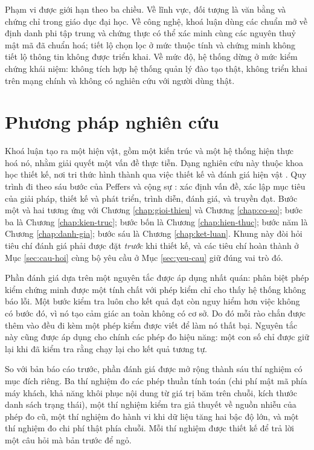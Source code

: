 Phạm vi được giới hạn theo ba chiều. Về lĩnh vực, đối tượng là văn bằng và chứng chỉ trong giáo dục đại học. Về công nghệ, khoá luận dùng các chuẩn mở về định danh phi tập trung và chứng thực có thể xác minh cùng các nguyên thuỷ mật mã đã chuẩn hoá; tiết lộ chọn lọc ở mức thuộc tính và chứng minh không tiết lộ thông tin không được triển khai. Về mức độ, hệ thống dừng ở mức kiểm chứng khái niệm: không tích hợp hệ thống quản lý đào tạo thật, không triển khai trên mạng chính và không có nghiên cứu với người dùng thật.

\section{Phương pháp nghiên cứu}
\label{sec:phuong-phap}

Khoá luận tạo ra một hiện vật, gồm một kiến trúc và một hệ thống hiện thực hoá nó, nhằm giải quyết một vấn đề thực tiễn. Dạng nghiên cứu này thuộc khoa học thiết kế, nơi tri thức hình thành qua việc thiết kế và đánh giá hiện vật \cite{Hevner2004}. Quy trình đi theo sáu bước của Peffers và cộng sự \cite{Peffers2007}: xác định vấn đề, xác lập mục tiêu của giải pháp, thiết kế và phát triển, trình diễn, đánh giá, và truyền đạt. Bước một và hai tương ứng với Chương \ref{chap:gioi-thieu} và Chương \ref{chap:co-so}; bước ba là Chương \ref{chap:kien-truc}; bước bốn là Chương \ref{chap:hien-thuc}; bước năm là Chương \ref{chap:danh-gia}; bước sáu là Chương \ref{chap:ket-luan}. Khung này đòi hỏi tiêu chí đánh giá phải được đặt \emph{trước} khi thiết kế, và các tiêu chí hoàn thành ở Mục \ref{sec:cau-hoi} cùng bộ yêu cầu ở Mục \ref{sec:yeu-cau} giữ đúng vai trò đó.

Phần đánh giá dựa trên một nguyên tắc được áp dụng nhất quán: phân biệt phép kiểm chứng minh được một tính chất với phép kiểm chỉ cho thấy hệ thống không báo lỗi. Một bước kiểm tra luôn cho kết quả đạt còn nguy hiểm hơn việc không có bước đó, vì nó tạo cảm giác an toàn không có cơ sở. Do đó mỗi rào chắn được thêm vào đều đi kèm một phép kiểm được viết để làm nó thất bại. Nguyên tắc này cũng được áp dụng cho chính các phép đo hiệu năng: một con số chỉ được giữ lại khi đã kiểm tra rằng chạy lại cho kết quả tương tự.

So với bản báo cáo trước, phần đánh giá được mở rộng thành sáu thí nghiệm có mục đích riêng. Ba thí nghiệm đo các phép thuần tính toán (chi phí mật mã phía máy khách, khả năng khôi phục nội dung từ giá trị băm trên chuỗi, kích thước danh sách trạng thái), một thí nghiệm kiểm tra giả thuyết về nguồn nhiễu của phép đo cũ, một thí nghiệm đo hành vi khi dữ liệu tăng hai bậc độ lớn, và một thí nghiệm đo chi phí thật phía chuỗi. Mỗi thí nghiệm được thiết kế để trả lời một câu hỏi mà bản trước để ngỏ.

